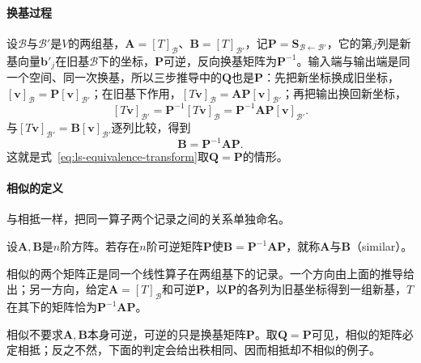 \paragraph{换基过程}
设$\mathcal B$与$\mathcal B'$是$V$的两组基，$\bm A=[T]_{\mathcal B}$、$\bm B=[T]_{\mathcal B'}$，记$\bm P=\bm S_{\mathcal B\leftarrow\mathcal B'}$，它的第$j$列是新基向量$\bm b'_j$在旧基$\mathcal B$下的坐标，$\bm P$可逆，反向换基矩阵为$\bm P^{-1}$。输入端与输出端是同一个空间、同一次换基，所以三步推导中的$\bm Q$也是$\bm P$：先把新坐标换成旧坐标，$[\bm v]_{\mathcal B}=\bm P[\bm v]_{\mathcal B'}$；在旧基下作用，$[T\bm v]_{\mathcal B}=\bm A\bm P[\bm v]_{\mathcal B'}$；再把输出换回新坐标，
\[
 [T\bm v]_{\mathcal B'}=\bm P^{-1}[T\bm v]_{\mathcal B}=\bm P^{-1}\bm A\bm P[\bm v]_{\mathcal B'}.
\]
与$[T\bm v]_{\mathcal B'}=\bm B[\bm v]_{\mathcal B'}$逐列比较，得到
\begin{equation}
 \bm B=\bm P^{-1}\bm A\bm P.
 \label{eq:linear-algebra-similarity-change-basis}
\end{equation}
这就是式~\eqref{eq:ls-equivalence-transform}取$\bm Q=\bm P$的情形。

\paragraph{相似的定义}
\label{sec:ls-similarity-meaning}
与相抵一样，把同一算子两个记录之间的关系单独命名。
\begin{definition}[矩阵相似]
\label{def:ls-matrix-similarity}
设$\bm A,\bm B$是$n$阶方阵。若存在$n$阶可逆矩阵$\bm P$使$\bm B=\bm P^{-1}\bm A\bm P$，就称$\bm A$与$\bm B$（similar）。
\end{definition}
相似的两个矩阵正是同一个线性算子在两组基下的记录。一个方向由上面的推导给出；另一方向，给定$\bm A=[T]_{\mathcal B}$和可逆$\bm P$，以$\bm P$的各列为旧基坐标得到一组新基，$T$在其下的矩阵恰为$\bm P^{-1}\bm A\bm P$。

相似不要求$\bm A,\bm B$本身可逆，可逆的只是换基矩阵$\bm P$。取$\bm Q=\bm P$可见，相似的矩阵必定相抵；反之不然，下面的判定会给出秩相同、因而相抵却不相似的例子。

